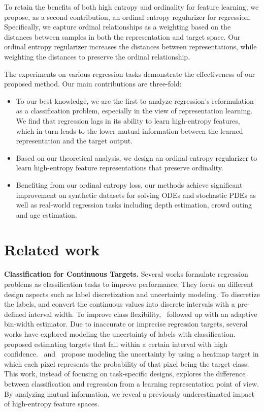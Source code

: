 \documentclass{article} \usepackage{iclr2023_conference,times}
\def\shihao{\textcolor{black}}
\begin{document}
To retain the benefits of both high entropy and ordinality for feature learning, we propose, as a second contribution, an 
ordinal entropy \shihao{regularizer}
for regression.  
Specifically, we capture ordinal relationships as a weighting based on the distances between samples in both the representation and target space. 
Our ordinal entropy \shihao{regularizer} increases the distances between representations, while weighting the distances to preserve the ordinal relationship.



The experiments on various regression tasks demonstrate the effectiveness of our proposed method.
Our main contributions are three-fold: 
\begin{itemize}
    \item To our best knowledge, we are the first to analyze regression's reformulation as a classification problem, especially in the view of representation learning. {We find that regression lags in its ability to learn high-entropy features, which in turn leads to the lower mutual information between the learned representation and the target output.}
    \item Based on our theoretical analysis, we design an ordinal entropy \shihao{regularizer} to learn high-entropy feature representations that preserve ordinality.
    \item Benefiting from our ordinal entropy loss, our methods achieve significant improvement on synthetic datasets for solving ODEs and stochastic PDEs as well as real-world regression tasks including depth estimation, crowd outing and age estimation. 
\end{itemize}


\section{Related work}\label{sec:relatedwork}

\textbf{Classification for Continuous Targets.} 
Several works formulate regression problems as classification tasks to improve performance.  They focus on different design aspects such as label discretization and uncertainty modeling. 
To discretize the labels, \citet{cao2017estimating,fu2018deep} and \citet{liu2019counting} convert the continuous values into discrete intervals with a pre-defined interval width. 
To improve class flexibility,~\citet{bhat2021adabins} followed up with an adaptive bin-width estimator. 
Due to inaccurate or imprecise regression targets, several works have explored modeling the uncertainty of labels with classification. \citet{liu2019counting} proposed estimating targets that fall within a certain interval with high confidence.~\citet{tompson2014joint} and~\cite{newell2016stacked} propose modeling the uncertainty by using a heatmap target in which each pixel represents the probability of that pixel being the target class.  This work, instead of focusing on task-specific designs, explores the difference between classification and regression from a learning representation point of view.  By analyzing mutual information, we reveal a previously underestimated impact of high-entropy feature spaces. 
\end{document}
